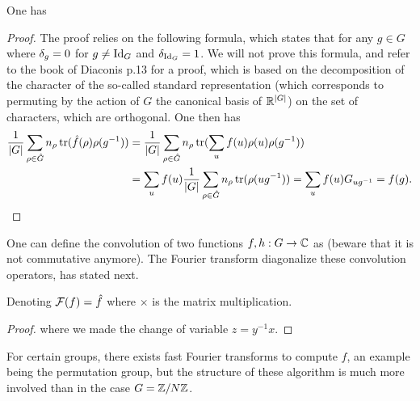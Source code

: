 \begin{prop}
One has
\end{prop}
\begin{proof}
The proof relies on the following formula, which states that for any $g \in G$
where $\delta_g=0$ for $g \neq \mathrm{Id}_G$ and $\delta_{\mathrm{Id}_G}=1$. We will not prove this formula, and refer to the book of Diaconis p.13 for a proof, which is based on the decomposition of the character of the so-called standard representation (which corresponds to permuting by the action of $G$ the canonical basis of $\mathbb{R}^{|G|}$) on the set of characters, which are orthogonal. 
%
One then has 
\begin{align*}
	\frac{1}{|G|} \sum_{\rho \in \hat G} n_\rho \operatorname{tr}( \hat f(\rho) \rho(g^{-1}) ) 
	&=  \frac{1}{|G|} \sum_{\rho \in \hat G} n_\rho \operatorname{tr}( \sum_u f(u) \rho(u) \rho(g^{-1}) ) \\
	&=  \sum_u  f(u) \frac{1}{|G|}  \sum_{\rho \in \hat G} n_\rho \operatorname{tr}( \rho(u g^{-1}) )
	=  \sum_u  f(u) G_{ug^{-1}} = f(g).
\end{align*}
\end{proof}





One can define the convolution of two functions $f,h : G \rightarrow \mathbb{C}$ as
(beware that it is not commutative anymore). The Fourier transform diagonalize these convolution operators, has stated next.

\begin{prop}
Denoting $\mathcal{F}(f) = \hat f$
where $\times$ is the matrix multiplication.
\end{prop}
\begin{proof}
where we made the change of variable $z=y^{-1}x$.
\end{proof}


For certain groups, there exists fast Fourier transforms to compute $\hat f$, an example being the permutation group, but the structure of these algorithm is much more involved than in the case $G=\mathbb{Z}/N\mathbb{Z}$. 

